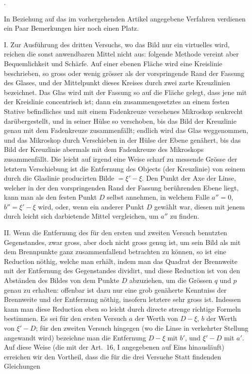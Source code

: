 \documentclass[11pt,a4paper]{article}
\begin{document}
\bigskip{}.

\smallskip
In Beziehung auf das im vorhergehenden Artikel angegebene Verfahren verdienen ein Paar Bemerkungen hier noch einen Platz.

I. Zur Ausführung des dritten Versuchs, wo das Bild nur ein virtuelles wird, reichen die sonst anwendbaren Mittel nicht aus: folgende Methode vereint aber Bequemlichkeit und Schärfe. Auf einer ebenen Fläche wird eine Kreislinie beschrieben, so gross oder wenig grösser als der vorspringende Rand der Fassung des Glases, und der Mittelpunkt dieses Kreises durch zwei zarte Kreuzlinien bezeichnet. Das Glas wird mit der Fassung so auf die Fläche gelegt, dass jene mit der Kreislinie concentrisch ist; dann ein zusammengesetztes an einem festen Stative befindliches und mit einem Fadenkreuze versehenes Mikroskop senkrecht darübergestellt, und in seiner Hülse so verschoben, bis das Bild der Kreuzlinie genau mit dem Fadenkreuze zusammenfällt; endlich wird das Glas weggenommen, und das Mikroskop durch Verschieben in der Hülse der Ebene genähert, bis das Bild der Kreuzlinie abermals mit dem Fadenkreuze des Mikroskops zusammenfällt. Die leicht auf irgend eine Weise scharf zu messende Grösse der letztern Verschiebung ist die Entfernung des Objects (der Kreuzlinie) von seinem durch die Glaslinie producirten Bilde $= \xi' - \xi$. Den Punkt der Axe der Linse, welcher in der den vorspringenden Rand der Fassung berührenden Ebene liegt, kann man als den festen Punkt $D$ selbst annehmen, in welchem Falle $a'' = 0$, $b'' = \xi' - \xi$ wird, oder, wenn ein anderer Punkt $D$ gewählt war, diesen mit jenem durch leicht sich darbietende Mittel vergleichen, um $a''$ zu finden.

II. Wenn die Entfernung des für den ersten und zweiten Versuch benutzten Gegenstandes, zwar gross, aber doch nicht gross genug ist, um sein Bild als mit dem Brennpunkte ganz zusammenfallend betrachten zu können, so ist eine Reduction nöthig, welche man erhält, indem man das Quadrat der Brennweite mit der Entfernung des Gegenstandes dividirt, und diese Reduction ist von den Abständen des Bildes von dem Punkte $D$ abzuziehen, um die Grössen $q$ und $p$ genau zu erhalten: offenbar ist dazu nur eine grob genäherte Kenntniss der Brennweite und der Entfernung nöthig, insofern letztere sehr gross ist. Indessen kann man diese Reduction eben so leicht durch directe strenge richtige Formeln bestimmen. Es sei für den ersten Versuch $a$ der Werth von $D - \xi$, $b$ der Werth von $\xi' - D$; für den zweiten Versuch hingegen (wo die Linse in verkehrter Stellung angewandt wird) bezeichne man die Entfernung $D - \xi$ mit $b'$, und $\xi' - D$ mit $a'$. Auf diese Weise (die mit der Art.~16, I angegebenen auf Eins hinausläuft) erreichen wir den Vortheil, dass die für die drei Versuche Statt findenden Gleichungen
\end{document}
